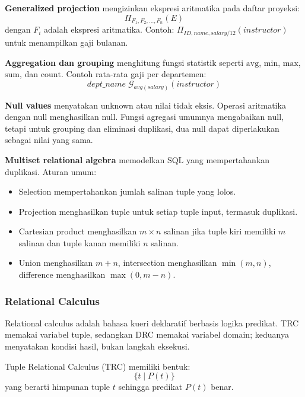 \textbf{Generalized projection} mengizinkan ekspresi aritmatika pada daftar proyeksi:
\[
    \Pi_{F_1,F_2,\ldots,F_n}(E)
\]
dengan \(F_i\) adalah ekspresi aritmatika. Contoh: \(\Pi_{ID,name,salary/12}(instructor)\) untuk menampilkan gaji bulanan.

\textbf{Aggregation dan grouping} menghitung fungsi statistik seperti \(\mathrm{avg}\), \(\mathrm{min}\), \(\mathrm{max}\), \(\mathrm{sum}\), dan \(\mathrm{count}\). Contoh rata-rata gaji per departemen:
\[
    dept\_name\; \mathcal{G}_{avg(salary)}(instructor)
\]

\textbf{Null values} menyatakan unknown atau nilai tidak eksis. Operasi aritmatika dengan null menghasilkan null. Fungsi agregasi umumnya mengabaikan null, tetapi untuk grouping dan eliminasi duplikasi, dua null dapat diperlakukan sebagai nilai yang sama.

\textbf{Multiset relational algebra} memodelkan SQL yang mempertahankan duplikasi. Aturan umum:
\begin{itemize}
    \item Selection mempertahankan jumlah salinan tuple yang lolos.
    \item Projection menghasilkan tuple untuk setiap tuple input, termasuk duplikasi.
    \item Cartesian product menghasilkan \(m \times n\) salinan jika tuple kiri memiliki \(m\) salinan dan tuple kanan memiliki \(n\) salinan.
    \item Union menghasilkan \(m+n\), intersection menghasilkan \(\min(m,n)\), difference menghasilkan \(\max(0,m-n)\).
\end{itemize}

\subsubsection{Relational Calculus}

\begin{jawab}
Relational calculus adalah bahasa kueri deklaratif berbasis logika predikat. TRC memakai variabel tuple, sedangkan DRC memakai variabel domain; keduanya menyatakan kondisi hasil, bukan langkah eksekusi.
\end{jawab}

Tuple Relational Calculus (TRC) memiliki bentuk:
\begin{equation}
    \{t \mid P(t)\}
    \label{eq:trc}
\end{equation}
yang berarti himpunan tuple \(t\) sehingga predikat \(P(t)\) benar.

